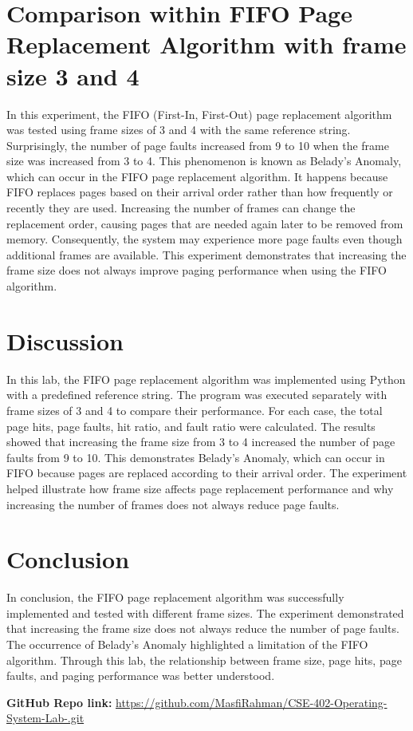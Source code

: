 \documentclass[12pt,a4paper]{article}
\begin{document}
\section{Comparison within FIFO Page Replacement Algorithm with frame size 3 and 4}
In this experiment, the FIFO (First-In, First-Out) page replacement algorithm was tested using frame sizes of 3 and 4 with the same reference string. Surprisingly, the number of page faults increased from 9 to 10 when the frame size was increased from 3 to 4. This phenomenon is known as Belady's Anomaly, which can occur in the FIFO page replacement algorithm. It happens because FIFO replaces pages based on their arrival order rather than how frequently or recently they are used. Increasing the number of frames can change the replacement order, causing pages that are needed again later to be removed from memory. Consequently, the system may experience more page faults even though additional frames are available. This experiment demonstrates that increasing the frame size does not always improve paging performance when using the FIFO algorithm.

\section{Discussion}
In this lab, the FIFO page replacement algorithm was implemented using Python with a predefined reference string. The program was executed separately with frame sizes of 3 and 4 to compare their performance. For each case, the total page hits, page faults, hit ratio, and fault ratio were calculated. The results showed that increasing the frame size from 3 to 4 increased the number of page faults from 9 to 10. This demonstrates Belady's Anomaly, which can occur in FIFO because pages are replaced according to their arrival order. The experiment helped illustrate how frame size affects page replacement performance and why increasing the number of frames does not always reduce page faults.

\section{Conclusion}
In conclusion, the FIFO page replacement algorithm was successfully implemented and tested with different frame sizes. The experiment demonstrated that increasing the frame size does not always reduce the number of page faults. The occurrence of Belady's Anomaly highlighted a limitation of the FIFO algorithm. Through this lab, the relationship between frame size, page hits, page faults, and paging performance was better understood.

\vspace{2cm}
\noindent \textbf{GitHub Repo link:} \href{https://github.com/MasfiRahman/CSE-402-Operating-System-Lab-.git}{https://github.com/MasfiRahman/CSE-402-Operating-System-Lab-.git}
\end{document}

